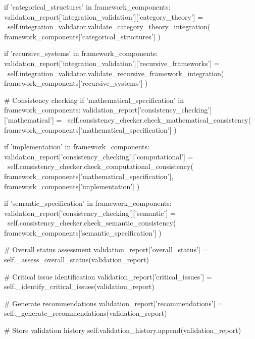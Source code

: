             if 'categorical_structures' in framework_components:
                validation_report['integration_validation']['category_theory'] = \
                    self.integration_validator.validate_category_theory_integration(
                        framework_components['categorical_structures']
                    )
                    
            if 'recursive_systems' in framework_components:
                validation_report['integration_validation']['recursive_frameworks'] = \
                    self.integration_validator.validate_recursive_framework_integration(
                        framework_components['recursive_systems']
                    )
            
            \# Consistency checking
            if 'mathematical_specification' in framework_components:
                validation_report['consistency_checking']['mathematical'] = \
                    self.consistency_checker.check_mathematical_consistency(
                        framework_components['mathematical_specification']
                    )
                    
            if 'implementation' in framework_components:
                validation_report['consistency_checking']['computational'] = \
                    self.consistency_checker.check_computational_consistency(
                        framework_components['mathematical_specification'],
                        framework_components['implementation']
                    )
                    
            if 'semantic_specification' in framework_components:
                validation_report['consistency_checking']['semantic'] = \
                    self.consistency_checker.check_semantic_consistency(
                        framework_components['semantic_specification']
                    )
            
            \# Overall status assessment
            validation_report['overall_status'] = self._assess_overall_status(validation_report)
            
            \# Critical issue identification
            validation_report['critical_issues'] = self._identify_critical_issues(validation_report)
            
            \# Generate recommendations
            validation_report['recommendations'] = self._generate_recommendations(validation_report)
            
            \# Store validation history
            self.validation_history.append(validation_report)
            
